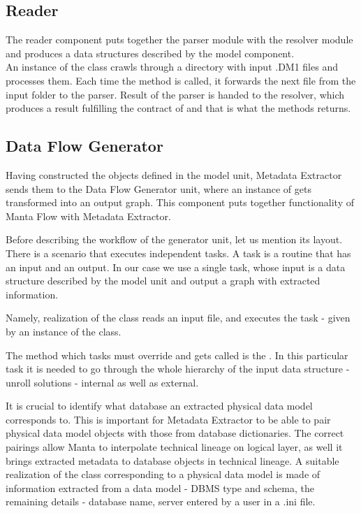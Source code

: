 \subsection{Reader}

The reader component puts together the parser module with the resolver module and produces a data structures described by the model component. \\

An instance of the  class crawls through a directory with input .DM1 files and processes them. 
Each time the  method is called, it forwards the next file from the input folder to the parser. Result of the parser is handed to the resolver, which produces a result fulfilling the contract of  and that is what the  methods returns.

\subsection{Data Flow Generator}

Having constructed the objects defined in the model unit, Metadata Extractor sends them to the Data Flow Generator unit, where an instance of  gets transformed into an output graph. This component puts together functionality of Manta Flow with Metadata Extractor.

Before describing the workflow of the generator unit, let us mention its layout.
There is a scenario that executes independent tasks. A task is a routine that has an input and an output. In our case we use a single task, whose input is a data structure described by the model unit and output a graph with extracted information.

 Namely, realization of the class  reads an input file, and executes the task - given by an instance of the  class. 
 
 The method which tasks must override and gets called is the . In this particular task it is needed to go through the whole hierarchy of the input data structure -  unroll solutions - internal as well as external.

It is crucial to identify what database an extracted physical data model corresponds to.
This is important for Metadata Extractor to be able to pair physical data model objects with those from database dictionaries. The correct pairings allow Manta to interpolate technical lineage on logical layer, as well it brings extracted metadata to database objects in technical lineage.
A suitable realization of the  class corresponding to a physical data model is made of information extracted from a data model - DBMS type and schema, the remaining details - database name, server entered by a user in a .ini file.

